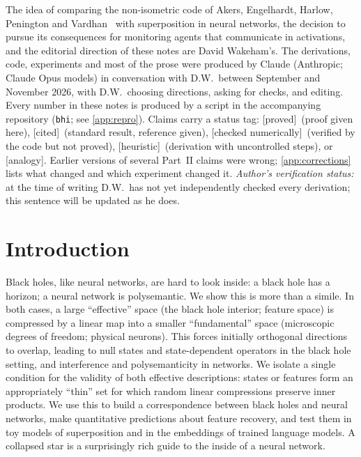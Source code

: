 \documentclass[11pt]{amsart}
\theoremstyle{plain}
\theoremstyle{definition}
\theoremstyle{remark}
\newcommand{\repo}{\texttt{bhi}}
\newcommand{\proved}{\textsf{\small[proved]}}
\newcommand{\cited}{\textsf{\small[cited]}}
\newcommand{\numchk}{\textsf{\small[checked numerically]}}
\newcommand{\heur}{\textsf{\small[heuristic]}}
\newcommand{\analogy}{\textsf{\small[analogy]}}
\begin{document}
\begin{tcolorbox}[colback=black!3, colframe=black!40, title=How these notes were made, fonttitle=\bfseries\small, fontupper=\small]
The idea of comparing the non-isometric code of Akers, Engelhardt, Harlow, Penington and Vardhan~\cite{AEHPV}
with superposition in neural networks, the decision to pursue its consequences for monitoring agents that
communicate in activations, and the editorial direction of these notes are David Wakeham's. The derivations,
code, experiments and most of the prose were produced by Claude (Anthropic; Claude Opus models) in conversation
with D.W.\ between September and November 2026, with D.W.\ choosing directions, asking for checks, and editing.
Every number in these notes is produced by a script in the accompanying repository (\repo; see
\cref{app:repro}). Claims carry a status tag: \proved\ (proof given here), \cited\ (standard result, reference
given), \numchk\ (verified by the code but not proved), \heur\ (derivation with uncontrolled steps), or
\analogy. Earlier versions of several Part~II claims were wrong; \cref{app:corrections} lists what changed and
which experiment changed it. \emph{Author's verification status:} at the time of writing D.W.\ has not yet
independently checked every derivation; this sentence will be updated as he does.
\end{tcolorbox}
\newpage
\tableofcontents
\newpage
\section{Introduction}\label{sec:intro}

Black holes, like neural networks, are hard to look inside: a black hole has a horizon; a neural network is
polysemantic. We show this is more than a simile. In both cases, a large ``effective'' space (the black hole
interior; feature space) is compressed by a linear map into a smaller ``fundamental'' space (microscopic degrees
of freedom; physical neurons). This forces initially orthogonal directions to overlap, leading to null states and
state-dependent operators in the black hole setting, and interference and polysemanticity in networks. We isolate a
single condition for the validity of both effective descriptions: states or features form an appropriately
``thin'' set for which random linear compressions preserve inner products. We use this to build a correspondence
between black holes and neural networks, make quantitative predictions about feature recovery, and test them in
toy models of superposition and in the embeddings of trained language models. A collapsed star is a surprisingly
rich guide to the inside of a neural network.
\end{document}

